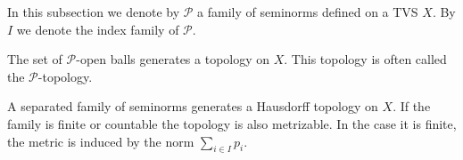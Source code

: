 	In this subsection we denote by $\mathscr{P}$ a family of seminorms defined on a TVS $X$. By $I$ we denote the index family of $\mathscr{P}$.
	
	
	\begin{property}
		The set of $\mathscr{P}$-open balls generates a topology on $X$. This topology is often called the $\mathscr{P}$-topology.
	\end{property}
	\begin{property}
		A separated family of seminorms generates a Hausdorff topology on $X$. If the family is finite or countable the topology is also metrizable. In the case it is finite, the metric is induced by the norm $\sum_{i\in I}p_i$.
	\end{property}

